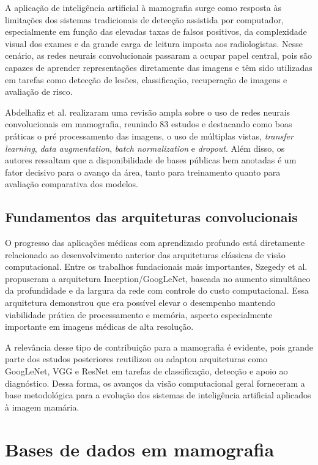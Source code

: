 \documentclass[
    12pt,
    openright,
    oneside,
    a4paper,
    english,
    brazil
]{abntex2}
\begin{document}
A aplicação de inteligência artificial à mamografia surge como resposta às limitações dos sistemas tradicionais de detecção assistida por computador, especialmente em função das elevadas taxas de falsos positivos, da complexidade visual dos exames e da grande carga de leitura imposta aos radiologistas. Nesse cenário, as redes neurais convolucionais passaram a ocupar papel central, pois são capazes de aprender representações diretamente das imagens e têm sido utilizadas em tarefas como detecção de lesões, classificação, recuperação de imagens e avaliação de risco.

Abdelhafiz et al. \cite{abdelhafiz2019} realizaram uma revisão ampla sobre o uso de redes neurais convolucionais em mamografia, reunindo 83 estudos e destacando como boas práticas o pré processamento das imagens, o uso de múltiplas vistas, \textit{transfer learning}, \textit{data augmentation}, \textit{batch normalization} e \textit{dropout}. Além disso, os autores ressaltam que a disponibilidade de bases públicas bem anotadas é um fator decisivo para o avanço da área, tanto para treinamento quanto para avaliação comparativa dos modelos.

\subsection{Fundamentos das arquiteturas convolucionais}

O progresso das aplicações médicas com aprendizado profundo está diretamente relacionado ao desenvolvimento anterior das arquiteturas clássicas de visão computacional. Entre os trabalhos fundacionais mais importantes, Szegedy et al. \cite{szegedy2014} propuseram a arquitetura Inception/GoogLeNet, baseada no aumento simultâneo da profundidade e da largura da rede com controle do custo computacional. Essa arquitetura demonstrou que era possível elevar o desempenho mantendo viabilidade prática de processamento e memória, aspecto especialmente importante em imagens médicas de alta resolução.

A relevância desse tipo de contribuição para a mamografia é evidente, pois grande parte dos estudos posteriores reutilizou ou adaptou arquiteturas como GoogLeNet, VGG e ResNet em tarefas de classificação, detecção e apoio ao diagnóstico. Dessa forma, os avanços da visão computacional geral forneceram a base metodológica para a evolução dos sistemas de inteligência artificial aplicados à imagem mamária.

\section{Bases de dados em mamografia}
\end{document}
